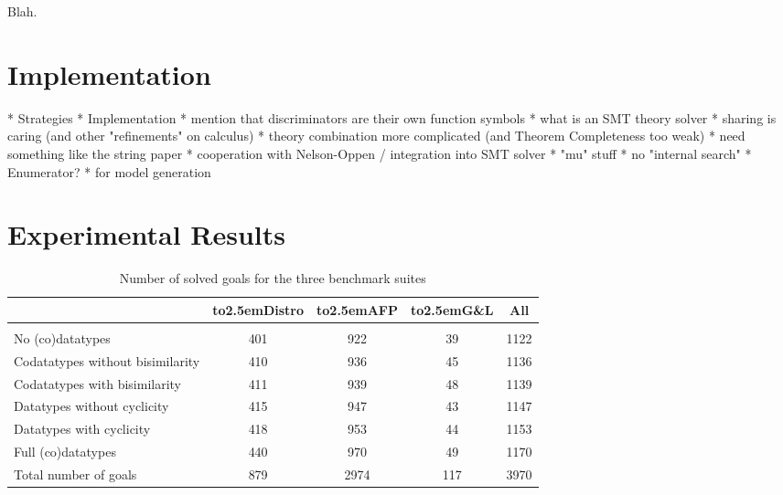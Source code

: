 Blah.

\section{Implementation}
\label{sec:the-theory-solver}

  * Strategies
  * Implementation
    * mention that discriminators are their own function symbols
    * what is an SMT theory solver
    * sharing is caring (and other "refinements" on calculus)
    * theory combination more complicated (and Theorem Completeness too weak)
      * need something like the string paper
    * cooperation with Nelson-Oppen / integration into SMT solver
    * "mu" stuff
    * no "internal search"
  * Enumerator?
    * for model generation


\section{Experimental Results}
\label{sec:experimental-results}

\newcommand\gandl{G\&L}
\newcommand\HD[1]{\hbox to2.5em{\hfill#1\hfill}}

\begin{table}[tbh!]
\begin{center}\begin{tabular}{l@{\kern1.5em}c@{\kern.5em}c@{\kern.5em}c@{\kern1.5em}c}
  & \HD{Distro} & \HD{AFP} & \HD{\gandl} & All
\\[1pt] %
\midrule
\\[-9pt] %
No (co)datatypes
  & 401 & 922 & \phantom{0}39 & 1122 \\
Codatatypes without bisimilarity
  & 410 & 936 & \phantom{0}45 & 1136 \\
Codatatypes with bisimilarity
  & 411 & 939 & \phantom{0}48 & 1139 \\
Datatypes without cyclicity
  & 415 & 947 & \phantom{0}43 & 1147 \\
Datatypes with cyclicity
  & 418 & 953 & \phantom{0}44 & 1153 \\
Full (co)datatypes
  & 440 & 970 & \phantom{0}49 & 1170 \\[\jot]
Total number of goals
  & 879 & 2974\phantom{0} & 117 & 3970
\end{tabular}\end{center}
\caption{Number of solved goals for the three benchmark suites}
\label{tab:bench}
\end{table}

